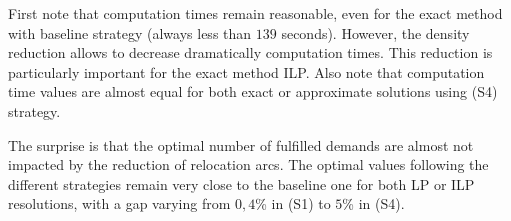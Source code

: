 \begin{bibunit}[ieeetr]
First note that computation times remain reasonable, even for the exact method with baseline strategy (always less than $139$ seconds).
However, the density reduction allows to decrease dramatically computation times. 
This reduction is particularly important for the exact method ILP.
Also note that computation time values are almost equal for both exact or approximate solutions using (S4) strategy.

The surprise is that the optimal number of fulfilled demands are almost not impacted by the reduction of relocation arcs.
The optimal values following  the different strategies remain very close  to the baseline one for both LP or ILP resolutions,
with a gap varying from $0,4$\% in (S1) to $5$\% in (S4).

\newpage
{}
\renewcommand{\bibname}{Bibliography of chapter \thechapter}
\end{bibunit}
